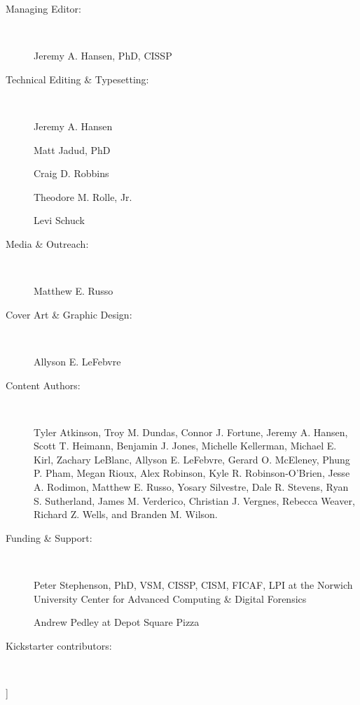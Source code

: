 \documentclass[11pt,final]{book}
\begin{document}
 \begin{description}

 \item[Managing Editor:] ~
 
 Jeremy A. Hansen, PhD, CISSP

 \item[Technical Editing \& Typesetting:] ~
 
 Jeremy A. Hansen
 
 Matt Jadud, PhD
 
 Craig D. Robbins
 
 Theodore M. Rolle, Jr.
 
 Levi Schuck

 \item[Media \& Outreach:] ~
 
 Matthew E. Russo

 \item[Cover Art \& Graphic Design:] ~
 
 Allyson E. LeFebvre

 \item[Content Authors:]\label{ContentAuthors} ~
 
Tyler Atkinson,
Troy M. Dundas,
Connor J. Fortune,
Jeremy A. Hansen,
Scott T. Heimann,
Benjamin J. Jones,
Michelle Kellerman,
Michael E. Kirl,
Zachary LeBlanc,
Allyson E. LeFebvre,
Gerard O. McEleney,
Phung P. Pham,
Megan Rioux,
Alex Robinson,
Kyle R. Robinson-O'Brien,
Jesse A. Rodimon,
Matthew E. Russo,
Yosary Silvestre,
Dale R. Stevens,
Ryan S. Sutherland,
James M. Verderico,
Christian J. Vergnes,
Rebecca Weaver,
Richard Z. Wells, and
Branden M. Wilson.

 \item[Funding \& Support:] ~
 
Peter Stephenson, PhD, VSM, CISSP, CISM, FICAF, LPI at the Norwich University Center for Advanced Computing \& Digital Forensics

Andrew Pedley at Depot Square Pizza

 \item[Kickstarter contributors:] ~  
 



 \end{description}

 \setcounter{page}{1}
      
%      
%      
      
      
      
      
      
     ]
      
      
      
      
\end{document}
